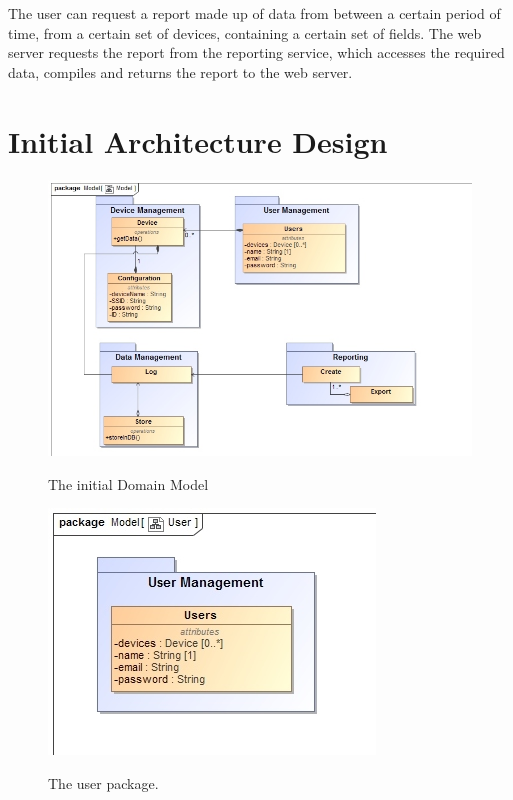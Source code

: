 \documentclass[paper=a4, fontsize=11pt]{scrartcl} %
\begin{document}
	The user can request a report made up of data from between a certain period of time, from a certain set of devices, containing a certain set of fields. The web server requests the report from the reporting service, which accesses the required data, compiles and returns the report to the web server.
	\newpage
	\section{Initial Architecture Design}
	\begin{figure}
		\includegraphics[width=\textwidth]{images/ArchitecturalModel.jpg}  \\
		\caption{The initial Domain Model}
	\end{figure}
	
	\begin{figure}
		\includegraphics[width=\textwidth]{images/User.jpg}  \\
		\caption{The user package.}
	\end{figure}
	
\end{document}
